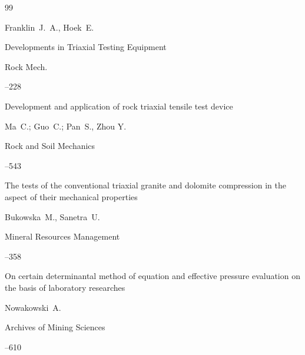 \begin{thebibliography}{99}







\by  Franklin~J.~A., Hoek~E. 

\paper Developments in Triaxial Testing Equipment

\jour  Rock Mech.



--228





\paper Development and application of rock triaxial tensile test device

\by Ma~C.; Guo~C.; Pan~S., Zhou Y.

\jour Rock and Soil Mechanics



--543   





\paper  The tests of the conventional triaxial granite and dolomite compression in the aspect of their mechanical properties

\by Bukowska~M., Sanetra~U.

\jour Mineral Resources Management



--358   






\paper  On certain determinantal method of equation and effective pressure evaluation on the basis of laboratory researches

\by Nowakowski~A.

\jour Archives of Mining Sciences



--610



\end{thebibliography}
